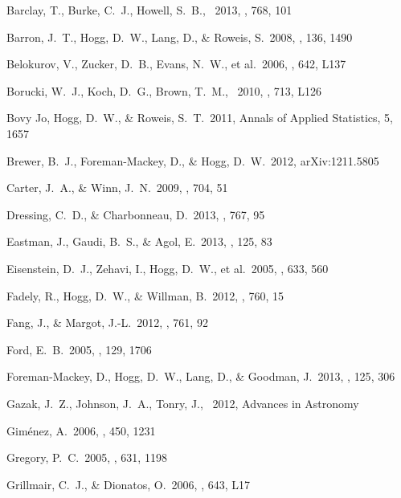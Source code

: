 \documentclass[letterpaper,12pt,preprint]{hack_aastex}
\begin{document}
\clearpage
\begin{thebibliography}{}\raggedright%

Barclay, T., Burke, C.~J., Howell, S.~B., \etal\ 2013, \apj, {768}, 101

Barron, J.~T., Hogg, D.~W., Lang, D., \& Roweis, S.\ 2008, \aj, 136, 1490

Belokurov, V., Zucker, D.~B., Evans, N.~W., et al.\ 2006, \apjl, 642, L137

Borucki, W.~J., Koch, D.~G., Brown, T.~M., \etal\ 2010, \apjl, {713}, L126

Bovy Jo, Hogg, D.~W., \& Roweis, S.~T.\ 2011, Annals of Applied Statistics,
5, 1657

Brewer, B.~J., Foreman-Mackey, D., \& Hogg, D.~W.\ 2012, arXiv:1211.5805

Carter, J.~A., \& Winn, J.~N.\ 2009, \apj, 704, 51

Dressing, C.~D., \& Charbonneau, D.\ 2013, \apj, {767}, 95

Eastman, J., Gaudi, B.~S., \& Agol, E.\ 2013, \pasp, {125}, 83

Eisenstein, D.~J., Zehavi, I., Hogg, D.~W., et al.\ 2005, \apj, 633, 560

Fadely, R., Hogg, D.~W., \& Willman, B.\ 2012, \apj, 760, 15

Fang, J., \& Margot, J.-L.\ 2012, \apj, 761, 92

Ford, E.~B.\ 2005, \aj, {129}, 1706

Foreman-Mackey, D., Hogg, D.~W., Lang, D., \& Goodman, J.\ 2013,
\pasp, {125}, 306

Gazak, J.~Z., Johnson, J.~A., Tonry, J., \etal\ 2012, Advances in Astronomy

Gim{\'e}nez, A.\ 2006, \aap, {450}, 1231

Gregory, P.~C.\ 2005, \apj, 631, 1198

Grillmair, C.~J., \& Dionatos, O.\ 2006, \apjl, 643, L17


\end{thebibliography}
\end{document}
